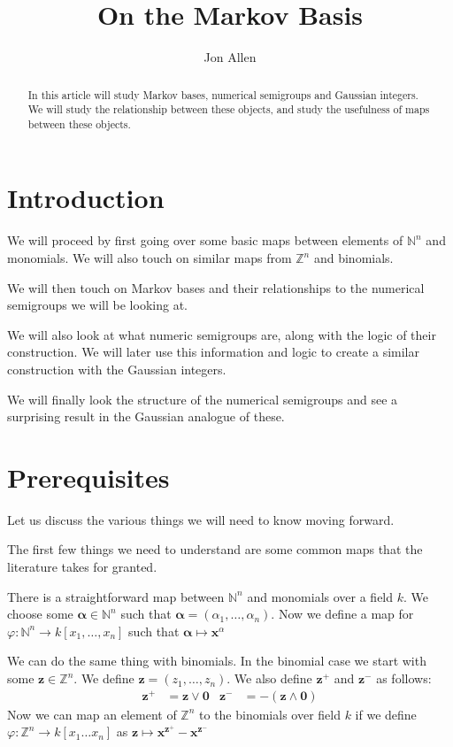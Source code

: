 \documentclass[11pt]{amsart}
\theoremstyle{plain}
\theoremstyle{definition}
\begin{document}
\title{On the Markov Basis}
\author{Jon Allen}
\begin{abstract}
In this article will study Markov bases, numerical semigroups and Gaussian integers. We will study the relationship between these objects, and study  the usefulness of maps between these objects.
\end{abstract}
\maketitle
\section{Introduction}
We will proceed by first going over some basic maps between elements of $\mathbb{N}^n$ and monomials. We will also touch on similar maps from $\mathbb{Z}^n$ and binomials.

We will then touch on Markov bases and their relationships to the numerical semigroups we will be looking at.

We will also look at what numeric semigroups are, along with the logic of their construction. We will later use this information and logic to create a similar construction with the Gaussian integers.

We will finally look the structure of the numerical semigroups and see a surprising result in the Gaussian analogue of these.
\section{Prerequisites}
Let us discuss the various things we will need to know moving forward.

The first few things we need to understand are some common maps that the literature takes for granted.

There is a straightforward map between $\mathbb{N}^n$ and monomials over a field $k$.
We choose some $\mathbf{\alpha}\in \mathbb{N}^n$ such that $\mathbf{\alpha}=(\alpha_1,\dots,\alpha_n)$.
Now we define a map for $\varphi:\mathbb{N}^n\to k[x_1,\dots,x_n]$ such that $\mathbf{\alpha}\mapsto \mathbf{x}^\alpha$

We can do the same thing with binomials.
In the binomial case we start with some $\mathbf{z}\in \mathbb{Z}^n$.
We define $\mathbf{z}=(z_1,\dots,z_n)$.
We also define $\mathbf{z}^+$ and $\mathbf{z}^-$ as follows:
\begin{align*}
  \mathbf{z}^+&=\mathbf{z}\vee\mathbf{0}&
  \mathbf{z}^-&=-(\mathbf{z}\wedge\mathbf{0})
\end{align*}
Now we can map an element of $\mathbb{Z}^n$ to the binomials over field $k$ if we define $\varphi:\mathbb{Z}^n\to k[x_1\dots x_n]$ as $\mathbf{z}\mapsto \mathbf{x}^{\mathbf{z}^+}-\mathbf{x}^{\mathbf{z}^-}$
\end{document}
